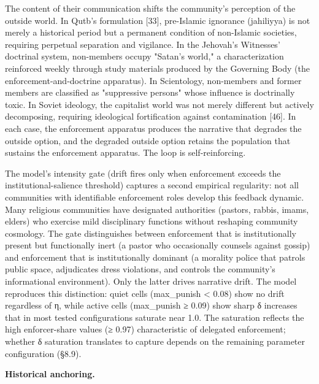 \documentclass[12pt]{article}
\begin{document}
The content of their communication shifts the community's perception of the outside world. In Qutb's formulation [33], pre-Islamic ignorance (jahiliyya) is not merely a historical period but a permanent condition of non-Islamic societies, requiring perpetual separation and vigilance. In the Jehovah's Witnesses' doctrinal system, non-members occupy "Satan's world," a characterization reinforced weekly through study materials produced by the Governing Body (the enforcement-and-doctrine apparatus). In Scientology, non-members and former members are classified as "suppressive persons" whose influence is doctrinally toxic. In Soviet ideology, the capitalist world was not merely different but actively decomposing, requiring ideological fortification against contamination [46]. In each case, the enforcement apparatus produces the narrative that degrades the outside option, and the degraded outside option retains the population that sustains the enforcement apparatus. The loop is self-reinforcing.

The model's intensity gate (drift fires only when enforcement exceeds the institutional-salience threshold) captures a second empirical regularity: not all communities with identifiable enforcement roles develop this feedback dynamic. Many religious communities have designated authorities (pastors, rabbis, imams, elders) who exercise mild disciplinary functions without reshaping community cosmology. The gate distinguishes between enforcement that is institutionally present but functionally inert (a pastor who occasionally counsels against gossip) and enforcement that is institutionally dominant (a morality police that patrols public space, adjudicates dress violations, and controls the community's informational environment). Only the latter drives narrative drift. The model reproduces this distinction: quiet cells (max\_punish \textless{} 0.08) show no drift regardless of η, while active cells (max\_punish ≥ 0.09) show sharp δ increases that in most tested configurations saturate near 1.0. The saturation reflects the high enforcer-share values (≥ 0.97) characteristic of delegated enforcement; whether δ saturation translates to capture depends on the remaining parameter configuration (§8.9).

%

\textbf{Historical anchoring.}
\end{document}

